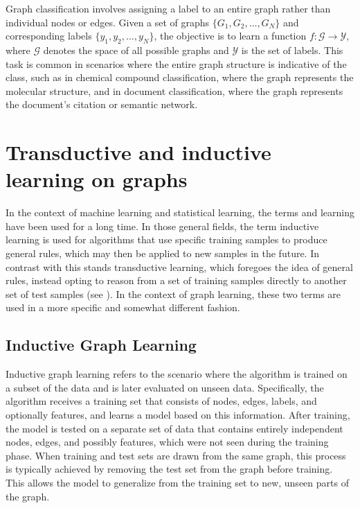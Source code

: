Graph classification involves assigning a label to an entire graph rather than individual nodes or edges. Given a set of graphs \( \{G_1, G_2, \ldots, G_N\} \) and corresponding labels \( \{y_1, y_2, \ldots, y_N\} \), the objective is to learn a function \( f: \mathcal{G} \rightarrow \mathcal{Y} \), where \( \mathcal{G} \) denotes the space of all possible graphs and \( \mathcal{Y} \) is the set of labels. This task is common in scenarios where the entire graph structure is indicative of the class, such as in chemical compound classification, where the graph represents the molecular structure, and in document classification, where the graph represents the document's citation or semantic network.

\section{Transductive and inductive learning on graphs}

In the context of machine learning and statistical learning, the terms  and  learning have been used for a long time. In those general fields, the term inductive learning is used for algorithms that use specific training samples to produce general rules, which may then be applied to new samples in the future. In contrast with this stands transductive learning, which foregoes the idea of general rules, instead opting to reason from a set of training samples directly to another set of test samples (see \cite{vapnik_nature_1995}). In the context of graph learning, these two terms are used in a more specific and somewhat different fashion.


\subsection{Inductive Graph Learning}

Inductive graph learning refers to the scenario where the algorithm is trained on a subset of the data and is later evaluated on unseen data. Specifically, the algorithm receives a training set that consists of nodes, edges, labels, and optionally features, and learns a model based on this information. After training, the model is tested on a separate set of data that contains entirely independent nodes, edges, and possibly features, which were not seen during the training phase. When training and test sets are drawn from the same graph, this process is typically achieved by removing the test set from the graph before training. This allows the model to generalize from the training set to new, unseen parts of the graph.

